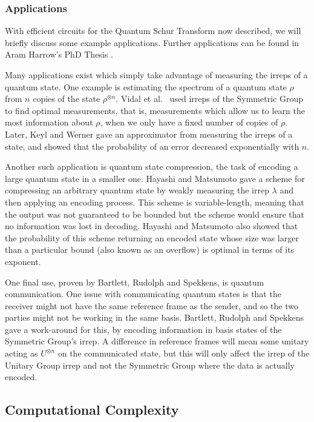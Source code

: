 \subsubsection{Applications}

With efficient circuits for the Quantum Schur Transform now described, we will briefly discuss some example applications. Further applications can be found in Aram Harrow's PhD Thesis \cite{harrow2005}.

Many applications exist which simply take advantage of measuring the irreps of a quantum state. One example is estimating the spectrum of a quantum state $\rho$ from $n$ copies of the state $\rho^{\otimes n}$. Vidal et al.~\cite{vidal1999} used irreps of the Symmetric Group to find optimal measurements, that is, measurements which allow us to learn the most information about $\rho$, when we only have a fixed number of copies of $\rho$. Later, Keyl and Werner \cite{keyl2001} gave an approximator from measuring the irreps of a state, and showed that the probability of an error decreased exponentially with $n$.

Another such application is quantum state compression, the task of encoding a large quantum state in a smaller one. Hayashi and Matsumoto \cite{hayashi2002, hayashi2002simple} gave a scheme for compressing an arbitrary quantum state by weakly measuring the irrep $\lambda$ and then applying an encoding process. This scheme is variable-length, meaning that the output was not guaranteed to be bounded but the scheme would ensure that no information was lost in decoding. Hayashi and Matsumoto also showed that the probability of this scheme returning an encoded state whose size was larger than a particular bound (also known as an overflow) is optimal in terms of its exponent.

One final use, proven by Bartlett, Rudolph and Spekkens\cite{bartlett2001}, is quantum communication. One issue with communicating quantum states is that the receiver might not have the same reference frame as the sender, and so the two parties might not be working in the same basis. Bartlett, Rudolph and Spekkens gave a work-around for this, by encoding information in basis states of the Symmetric Group's irrep. A difference in reference frames will mean some unitary acting as $U^{\otimes n}$ on the communicated state, but this will only affect the irrep of the Unitary Group irrep and not the Symmetric Group where the data is actually encoded.

\subsection{Computational Complexity}
\label{ssec:schur-simulation}

